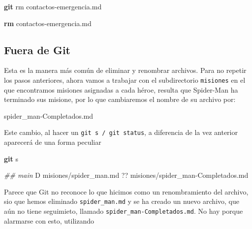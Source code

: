 \documentclass[
]{book}
\newenvironment{Shaded}{\begin{snugshade}}{\end{snugshade}}
\newcommand{\CommentTok}[1]{\textcolor[rgb]{0.56,0.35,0.01}{\textit{#1}}}
\newcommand{\ExtensionTok}[1]{#1}
\newcommand{\FunctionTok}[1]{\textcolor[rgb]{0.13,0.29,0.53}{\textbf{#1}}}
\newcommand{\NormalTok}[1]{#1}
\newcommand{\StringTok}[1]{\textcolor[rgb]{0.31,0.60,0.02}{#1}}
\begin{document}
\begin{Shaded}
\begin{Highlighting}[]
\FunctionTok{git}\NormalTok{ rm contactos{-}emergencia.md}
\end{Highlighting}
\end{Shaded}

\begin{Shaded}
\begin{Highlighting}[]
\FunctionTok{rm} \StringTok{\textquotesingle{}contactos{-}emergencia.md\textquotesingle{}}
\end{Highlighting}
\end{Shaded}

\subsection{Fuera de Git}\label{fuera-de-git}

Esta es la manera más común de eliminar y renombrar archivos. Para no repetir los pasos anteriores, ahora vamos a trabajar con el subdirectorio \texttt{misiones} en el que encontramos misiones asignadas a cada héroe, resulta que Spider-Man ha terminado sus misione, por lo que cambiaremos el nombre de su archivo por:

\begin{Shaded}
\begin{Highlighting}[]
\ExtensionTok{spider\_man{-}Completados.md}
\end{Highlighting}
\end{Shaded}

Este cambio, al hacer un \texttt{git\ s\ /\ git\ status}, a diferencia de la vez anterior aparecerá de una forma peculiar

\begin{Shaded}
\begin{Highlighting}[]
\FunctionTok{git}\NormalTok{ s}
\end{Highlighting}
\end{Shaded}

\begin{Shaded}
\begin{Highlighting}[]
\CommentTok{\#\# main}
 \ExtensionTok{D}\NormalTok{ misiones/spider\_man.md}
\ExtensionTok{??}\NormalTok{ misiones/spider\_man{-}Completados.md}
\end{Highlighting}
\end{Shaded}

Parece que Git no reconoce lo que hicimos como un renombramiento del archivo, sio que hemos eliminado \texttt{spider\_man.md} y se ha creado un nuevo archivo, que aún no tiene seguimieto, llamado \texttt{spider\_man-Completados.md}. No hay porque alarmarse con esto, utilizando
\end{document}
